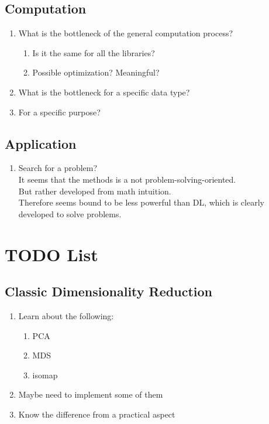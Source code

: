 \documentclass[10pt,a4paper]{article}
\begin{document}
\subsection{Computation}
\begin{enumerate}
	\item What is the bottleneck of the general computation process?
	\begin{enumerate}
		\item Is it the same for all the libraries?
		\item Possible optimization? Meaningful?
	\end{enumerate}	  
	\item What is the bottleneck for a specific data type?
	\item For a specific purpose?
\end{enumerate}
\subsection{Application}
\begin{enumerate}
	\item Search for a problem?\\
		  It seems that the methods is a not problem-solving-oriented.\\
		  But rather developed from math intuition.\\
		  Therefore seems bound to be less powerful than DL, which is clearly developed to solve problems.\\
		  
\end{enumerate}

\section{TODO List}
\subsection{Classic Dimensionality Reduction}
\begin{enumerate}
	\item Learn about the following:
	\begin{enumerate}
		\item PCA
		\item MDS
		\item isomap
	\end{enumerate}
	\item Maybe need to implement some of them
	\item Know the difference from a practical aspect
\end{enumerate}
\end{document}
